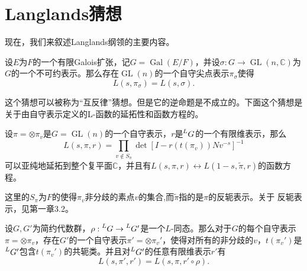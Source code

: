\begin{center}
\end{center}

\section{Langlands猜想}

现在，我们来叙述Langlands纲领的主要内容。

\begin{conjecture}
\label{conj:reciprocity}
设$E$为$F$的一个有限Galois扩张，记$G = \operatorname{Gal}(E/F)$，并设$\sigma: G \rightarrow \operatorname{GL}(n, \mathbb{C})$为$G$的一个不可约表示。那么存在$\operatorname{GL}(n)$的一个自守尖点表示$\pi_\sigma$使得
$$
L(s, \pi_\sigma) = L(s, \sigma).
$$
\end{conjecture}

这个猜想可以被称为“互反律”猜想。但是它的逆命题是不成立的。下面这个猜想是关于由自守表示定义的L-函数的延拓性和函数方程的。

\begin{conjecture}
设$\pi = \otimes \pi_v$是$G = \operatorname{GL}(n)$的一个自守表示，$r$是$\prescript{L}{}{G}$的一个有限维表示，那么
$$
L(s,\pi,r) = \prod\limits_{v\not\in S_\pi} \det \left[ I - r(t(\pi_v))Nv^{-s} \right]^{-1}
$$
可以亚纯地延拓到整个复平面$\mathbb{C}$，并且有$L(s, \pi, r) \leftrightarrow L(1 − s, \widetilde{\pi}, r)$的函数方程。
\end{conjecture}

这里的$S_\pi$为$F$的使得$\pi_v$非分歧的素点$v$的集合,而$\widetilde{\pi}$指的是$\pi$的反轭表示。关于
反轭表示，见第一章3.2。

\begin{conjecture}
\label{conj:functor}
设$G,G'$为简约代数群，$\rho: \prescript{L}{}{G} \rightarrow \prescript{L}{}{G}'$是一个$L$-同态。那么对于$G$的每个自守表示$\pi = \otimes \pi_v$，存在$G'$的一个自守表示$\pi' = \otimes \pi_v'$，使得对所有的非分歧的$v$，$t(\pi_v')$是$\prescript{L}{}{G}'$包含$t(\pi_v')$的共轭类。并且对$\prescript{L}{}{G}'$的任意有限维表示$r'$有
$$
L(s, \pi', r') = L(s, \pi, r'\circ\rho).
$$
\end{conjecture}

